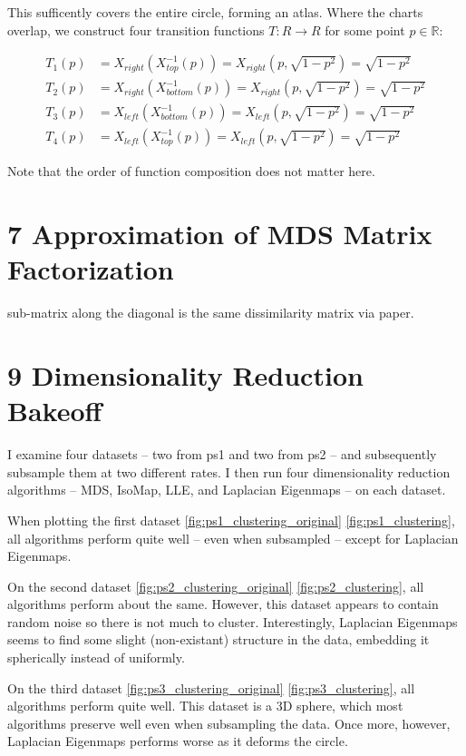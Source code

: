 \documentclass{article}
\begin{document}
        This sufficently covers the entire circle, forming an atlas. Where the charts overlap, we construct four transition functions $T: R \rightarrow R$ for some point $p \in \mathbb{R}$:

        \begin{align*}
            T_1(p) &= X_{right} (X_{top}^{-1}(p)) = X_{right} (p, \sqrt{1 - p^2}) =  \sqrt{1 - p^2} \\
            T_2(p) &= X_{right} (X_{bottom}^{-1}(p)) = X_{right} (p, \sqrt{1 - p^2}) =  \sqrt{1 - p^2} \\
            T_3(p) &= X_{left} (X_{bottom}^{-1}(p)) = X_{left}(p, \sqrt{1 - p^2}) = \sqrt{1 - p^2} \\
            T_4(p) &= X_{left} (X_{top}^{-1}(p)) = X_{left}(p, \sqrt{1 - p^2}) = \sqrt{1 - p^2}
        \end{align*}

        Note that the order of function composition does not matter here.

\section*{7 Approximation of MDS Matrix Factorization}

sub-matrix along the diagonal is the same dissimilarity matrix via paper. 

\section*{9 Dimensionality Reduction Bakeoff}

        I examine four datasets -- two from ps1 and two from ps2 -- and subsequently subsample them at two different rates. I then run four dimensionality reduction algorithms -- MDS, IsoMap, LLE, and Laplacian Eigenmaps -- on each dataset.

        When plotting the first dataset \ref{fig:ps1_clustering_original} \ref{fig:ps1_clustering}, all algorithms perform quite well -- even when subsampled -- except for Laplacian Eigenmaps.
        
        On the second dataset \ref{fig:ps2_clustering_original} \ref{fig:ps2_clustering}, all algorithms perform about the same. However, this dataset appears to contain random noise so there is not much to cluster. Interestingly, Laplacian Eigenmaps seems to find some slight (non-existant) structure in the data, embedding it spherically instead of uniformly.

        On the third dataset \ref{fig:ps3_clustering_original} \ref{fig:ps3_clustering}, all algorithms perform quite well. This dataset is a 3D sphere, which most algorithms preserve well even when subsampling the data. Once more, however, Laplacian Eigenmaps performs worse as it deforms the circle.
\end{document}
